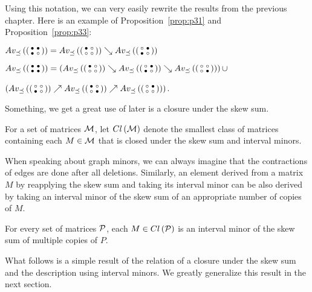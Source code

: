 Using this notation, we can very easily rewrite the results from the previous chapter. Here is an example of Proposition~\ref{prop:p31} and Proposition~\ref{prop:p33}:

\begin{prop}
$Av_{\preceq}\left(\left(\begin{smallmatrix}\bullet&\bullet\\\bullet&\circ\end{smallmatrix}\right)\right)=Av_{\preceq}\left(\left(\begin{smallmatrix}\bullet&\circ\\\circ&\circ\end{smallmatrix}\right)\right)\searrow Av_{\preceq}\left(\left(\begin{smallmatrix}\circ&\bullet\\\bullet&\circ\end{smallmatrix}\right)\right)$
\end{prop}

\begin{prop}
$Av_{\preceq}\left(\left(\begin{smallmatrix}\bullet&\bullet\\\bullet&\bullet\end{smallmatrix}\right)\right)=\left(Av_{\preceq}\left(\left(\begin{smallmatrix}\bullet&\circ\\\circ&\circ\end{smallmatrix}\right)\right)\searrow Av_{\preceq}\left(\left(\begin{smallmatrix}\circ&\bullet\\\bullet&\circ\end{smallmatrix}\right)\right)\searrow Av_{\preceq}\left(\left(\begin{smallmatrix}\circ&\circ\\\circ&\bullet\end{smallmatrix}\right)\right)\right)\cup$

\hspace{54mm}$\left(Av_{\preceq}\left(\left(\begin{smallmatrix}\circ&\circ\\\bullet&\circ\end{smallmatrix}\right)\right)\nearrow Av_{\preceq}\left(\left(\begin{smallmatrix}\bullet&\circ\\\circ&\bullet\end{smallmatrix}\right)\right)\nearrow Av_{\preceq}\left(\left(\begin{smallmatrix}\circ&\bullet\\\circ&\circ\end{smallmatrix}\right)\right)\right)$.
\end{prop}

Something, we get a great use of later is a closure under the skew sum.

\begin{defn}
For a set of matrices $\mathcal{M}$, let $Cl\left(\mathcal{M}\right)$ denote the smallest class of matrices containing each $M\in\mathcal{M}$ that is closed under the skew sum and interval minors.
\end{defn}

When speaking about graph minors, we can always imagine that the contractions of edges are done after all deletions. Similarly, an element derived from a matrix~$M$ by reapplying the skew sum and taking its interval minor can be also derived by taking an interval minor of the skew sum of an appropriate number of copies of $M$.

\begin{obs}
For every set of matrices $\mathcal{P}$, each $M\in Cl\left(\mathcal{P}\right)$ is an interval minor of the skew sum of multiple copies of $P$.
\end{obs}

What follows is a simple result of the relation of a closure under the skew sum and the description using interval minors. We greatly generalize this result in the next section.


